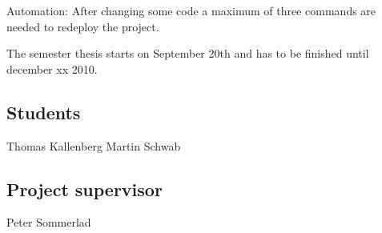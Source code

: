 \documentclass[a4paper,10pt]{scrreprt}
\begin{document}
Automation: After changing some code a maximum of three commands are needed to redeploy the project.

The semester thesis starts on September 20th and has to be finished until december xx 2010.

\subsection*{Students}
Thomas Kallenberg \dotfill
Martin Schwab \dotfill
\subsection*{Project supervisor}
Peter Sommerlad \dotfill
\end{document}
